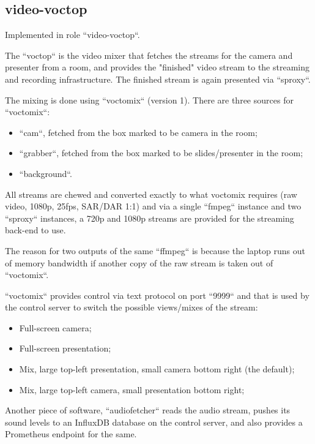 \documentclass{article}
\begin{document}
\subsection{video-voctop}

Implemented in role ``video-voctop``.

The ``voctop`` is the video mixer that fetches the streams for the camera and presenter from a room, and provides the "finished" video stream to the streaming and recording infrastructure. The finished stream is again presented via ``sproxy``.

The mixing is done using ``voctomix`` (version 1). There are three sources for ``voctomix``:

\begin{itemize}
  \item ``cam``, fetched from the box marked to be camera in the room;
  \item ``grabber``, fetched from the box marked to be slides/presenter in the room;
  \item ``background``.
\end{itemize}

All streams are chewed and converted exactly to what voctomix requires (raw video, 1080p, 25fps, SAR/DAR 1:1) and via a single ``fmpeg`` instance and two ``sproxy`` instances, a 720p and 1080p streams are provided for the streaming back-end to use.

The reason for two outputs of the same ``ffmpeg`` is because the laptop runs out of memory bandwidth if another copy of the raw stream is taken out of ``voctomix``.

``voctomix`` provides control via text protocol on port ``9999`` and that is used by the control server to switch the possible views/mixes of the stream:

\begin{itemize}
  \item Full-screen camera;
  \item Full-screen presentation;
  \item Mix, large top-left presentation, small camera bottom right (the default);
  \item Mix, large top-left camera, small presentation bottom right;
\end{itemize}

Another piece of software, ``audiofetcher`` reads the audio stream, pushes its sound levels to an InfluxDB database on the control server, and also provides a Prometheus endpoint for the same.
\end{document}
